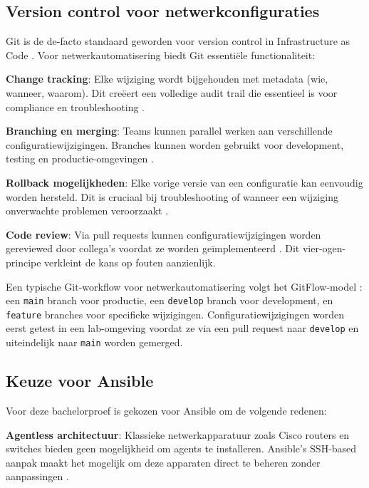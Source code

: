\subsection{Version control voor netwerkconfiguraties}
\label{subsec:version-control}

Git is de de-facto standaard geworden voor version control in Infrastructure as Code \autocite{Chacon2014ProGit}. 
Voor netwerkautomatisering biedt Git essentiële functionaliteit:

\textbf{Change tracking}: Elke wijziging wordt bijgehouden met metadata (wie, wanneer, waarom). 
Dit creëert een volledige audit trail die essentieel is voor compliance en troubleshooting \autocite{NIST2023NetworkSecurity}.

\textbf{Branching en merging}: Teams kunnen parallel werken aan verschillende configuratiewijzigingen. 
Branches kunnen worden gebruikt voor development, testing en productie-omgevingen \autocite{Driessen2010GitFlow}.

\textbf{Rollback mogelijkheden}: Elke vorige versie van een configuratie kan eenvoudig worden hersteld. 
Dit is cruciaal bij troubleshooting of wanneer een wijziging onverwachte problemen veroorzaakt \autocite{Loeliger2012VersionControl}.

\textbf{Code review}: Via pull requests kunnen configuratiewijzigingen worden gereviewed door collega's voordat ze worden geïmplementeerd \autocite{Forsgren2018Accelerate}. 
Dit vier-ogen-principe verkleint de kans op fouten aanzienlijk.

Een typische Git-workflow voor netwerkautomatisering volgt het GitFlow-model \autocite{Driessen2010GitFlow}: een \texttt{main} branch voor productie, een \texttt{develop} branch voor development, en \texttt{feature} branches voor specifieke wijzigingen.
Configuratiewijzigingen worden eerst getest in een lab-omgeving voordat ze via een pull request naar \texttt{develop} en uiteindelijk naar \texttt{main} worden gemerged.


\subsection{Keuze voor Ansible}
\label{subsec:keuze-ansible}

Voor deze bachelorproef is gekozen voor Ansible om de volgende redenen:

\textbf{Agentless architectuur}: Klassieke netwerkapparatuur zoals Cisco routers en switches bieden geen mogelijkheid om agents te installeren. 
Ansible's SSH-based aanpak maakt het mogelijk om deze apparaten direct te beheren zonder aanpassingen \autocite{Hochstein2017AnsibleUpRunning}.

